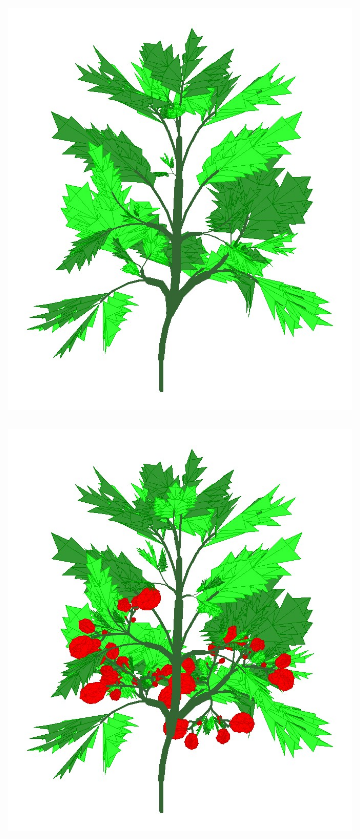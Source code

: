 \begin{figure}[h]
\begin{subfigure}{.24\textwidth}
		\label{fig:sub2}
	\end{subfigure}%
	\begin{subfigure}{.24\textwidth}
		\centering
		\includegraphics[width=\linewidth]{carla/figures/plantAging003.jpg}
		\label{fig:sub3}
	\end{subfigure}%
	\begin{subfigure}{.24\textwidth}
		\centering
		\includegraphics[width=\linewidth]{carla/figures/plantAging004.jpg}

\end{subfigure}
\end{figure}
